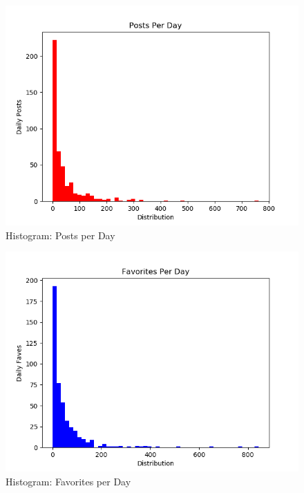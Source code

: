 \begin{figure}[!ht]
  \centering\includegraphics[width=\columnwidth]{images/post_hist.png}
  \caption{Histogram: Posts per Day}\label{f:post-hist}
\end{figure}

\begin{figure}[!ht]
  \centering\includegraphics[width=\columnwidth]{images/faves_hist.png}
  \caption{Histogram: Favorites per Day}\label{f:faves-hist}
\end{figure}

